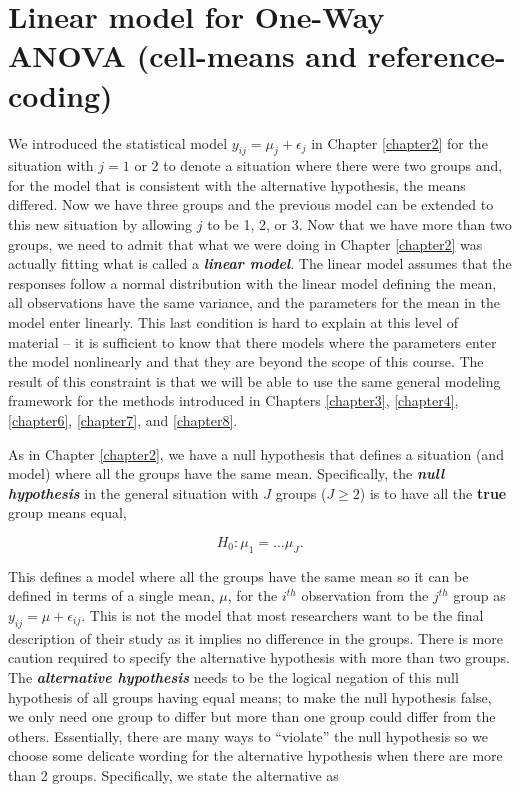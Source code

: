 \documentclass[]{book}
\begin{document}
\section{Linear model for One-Way ANOVA (cell-means and
reference-coding)}\label{section3-2}

We introduced the statistical model \(y_{ij} = \mu_j+\epsilon_j\) in
Chapter \ref{chapter2} for the situation with \(j = 1 \text{ or } 2\) to
denote a situation where there were two groups and, for the model that
is consistent with the alternative hypothesis, the means differed. Now
we have three groups and the previous model can be extended to this new
situation by allowing \(j\) to be 1, 2, or 3. Now that we have more than
two groups, we need to admit that what we were doing in Chapter
\ref{chapter2} was actually fitting what is called a
\textbf{\emph{linear model}}. The linear model assumes that the
responses follow a normal distribution with the linear model defining
the mean, all observations have the same variance, and the parameters
for the mean in the model enter linearly. This last condition is hard to
explain at this level of material -- it is sufficient to know that there
models where the parameters enter the model nonlinearly and that they
are beyond the scope of this course. The result of this constraint is
that we will be able to use the same general modeling framework for the
methods introduced in Chapters \ref{chapter3}, \ref{chapter4},
\ref{chapter6}, \ref{chapter7}, and \ref{chapter8}.

As in Chapter \ref{chapter2}, we have a null hypothesis that defines a
situation (and model) where all the groups have the same mean.
Specifically, the \textbf{\emph{null hypothesis}} in the general
situation with \(J\) groups (\(J\ge 2\)) is to have all the
\textbf{true} group means equal,

\[H_0:\mu_1 = \ldots \mu_J.\]

This defines a model where all the groups have the same mean so it can
be defined in terms of a single mean, \(\mu\), for the \(i^{th}\)
observation from the \(j^{th}\) group as \(y_{ij} = \mu+\epsilon_{ij}\).
This is not the model that most researchers want to be the final
description of their study as it implies no difference in the groups.
There is more caution required to specify the alternative hypothesis
with more than two groups. The \textbf{\emph{alternative hypothesis}}
needs to be the logical negation of this null hypothesis of all groups
having equal means; to make the null hypothesis false, we only need one
group to differ but more than one group could differ from the others.
Essentially, there are many ways to ``violate'' the null hypothesis so
we choose some delicate wording for the alternative hypothesis when
there are more than 2 groups. Specifically, we state the alternative as
\end{document}
